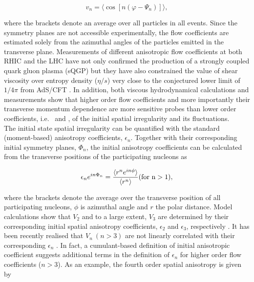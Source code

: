 \begin{equation}
v_{n} = \langle{\cos[n(\varphi - \Psi_n)]}\rangle,
\label{Eq:vn}
\end{equation}

where the brackets denote an average over all particles in all events. Since the symmetry planes are not accessible experimentally, the flow coefficients are estimated solely from the azimuthal angles of the particles emitted in the transverse plane. Measurements of different anisotropic flow coefficients at both RHIC \cite{Adams:2003am,Abelev:2007qg,Adler:2003kt,Adare:2006ti} and the LHC \cite{Abelev:2014pua,Adam:2016nfo,Acharya:2018zuq} have not only confirmed the production of a strongly coupled quark gluon plasma (sQGP) but they have also constrained the value of shear viscosity over entropy density ($\eta/s$) very close to the conjectured lower limit of $1/4\pi$ from AdS/CFT \cite{Kovtun:2004de}. In addition, both viscous hydrodynamical calculations and measurements \cite{Adam:2016izf} show that higher order flow coefficients and more importantly their transverse momentum dependence are more sensitive probes than lower order coefficients, i.e. \vtwo~and \vthree, of the initial spatial irregularity and its fluctuations.\\ %
The initial state spatial irregularity can be quantified with the standard (moment-based) anisotropy coefficients, $\epsilon_{n}$. Together with their corresponding initial symmetry planes, $\Phi_n$, the initial anisotropy coefficients can be calculated from the transverse positions of the participating nucleons as \cite{Alver:2010gr,Alver:2010dn} 

\begin{equation}
\epsilon_{n}e^{in\Phi_n} = \frac{\langle{r^{n}e^{in\phi}}\rangle}{\langle r^n\rangle}  (\rm{for}~n>1),
\label{Eq:epsilonn}
\end{equation}

where the brackets denote the average over the transverse position of all participating nucleons, $\phi$ is azimuthal angle and $r$ the polar distance. Model calculations show that $V_2$ and to a large extent, $V_3$ are  determined by their corresponding initial spatial anisotropy coefficients, $\epsilon_{2}$ and $\epsilon_{3}$, respectively \cite{Alver:2010gr}. It has been recently realised that $V_n~(n > 3)$ are not linearly correlated with their corresponding $\epsilon_{n}$ \cite{Bhalerao:2014xra}. In fact, a cumulant-based definition of initial anisotropic coefficient suggests additional terms in the definition of $\epsilon_{n}$ for higher order flow coefficients ($n>3$). As an example, the fourth order spatial anisotropy is given by \cite{Teaney:2013dta,Qian:2017ier} 
 
